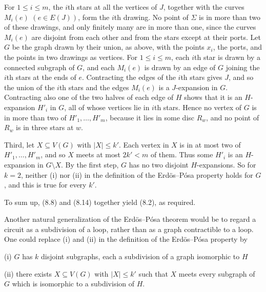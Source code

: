 {For $1 \le i \le m$, the $i$th stars at all the vertices of $J$, together with the curves $M_i(e)$
$(e \in E(J))$, form the $i$th drawing. No point of $\Sigma$ is in more than two of these drawings,
and only finitely many are in more than one, since the curves $M_i(e)$ are disjoint from each other
and from the stars except at their ports. Let $G$ be the graph drawn by their union, as above, with
the points $x_i$, the ports, and the points in two drawings as vertices. For $1 \le i \le m$, each
$i$th star is drawn by a connected subgraph of $G$, and each $M_i(e)$ is drawn by an edge of $G$
joining the $i$th stars at the ends of $e$. Contracting the edges of the $i$th stars gives $J$, and
so the union of the $i$th stars and the edges $M_i(e)$ is a $J$-expansion in $G$. Contracting also one
of the two halves of each edge of $H$ shows that it is an $H$-expansion $H'_i$ in $G$, all of whose
vertices lie in $i$th stars. Hence no vertex of $G$ is in more than two of
$H'_1, \dots, H'_m$, because it lies in some disc $R_w$, and no point of $R_w$ is in three stars
at $w$.

Third, let $X \subseteq V(G)$ with $|X| \le k'$. Each vertex in $X$ is in at most two of
$H'_1, \dots, H'_m$, and so $X$ meets at most $2k' < m$ of them. Thus some $H'_i$ is an
$H$-expansion in $G \setminus X$. By the first step, $G$ has no two disjoint $H$-expansions. So for
$k = 2$, neither (i) nor (ii) in the definition of the Erd\"os--P\'osa property holds for $G$, and
this is true for every $k'$.}

To sum up, (8.8) and (8.14) together yield (8.2), as required.

Another natural generalization of the Erd\"os--P\'osa theorem would be to regard a circuit as a subdivision of a loop, rather than as a graph contractible to a loop. One could replace (i) and (ii) in the definition of the Erd\"os--P\'osa property by

\hspace*{12pt}(i) $G$ has $k$ disjoint subgraphs, each a subdivision of a graph isomorphic to $H$

\hspace*{12pt}(ii) there exists $X \subseteq V(G)$ with $|X| \le k'$ such that $X$ meets every subgraph of $G$ which is isomorphic to a subdivision of $H$.
